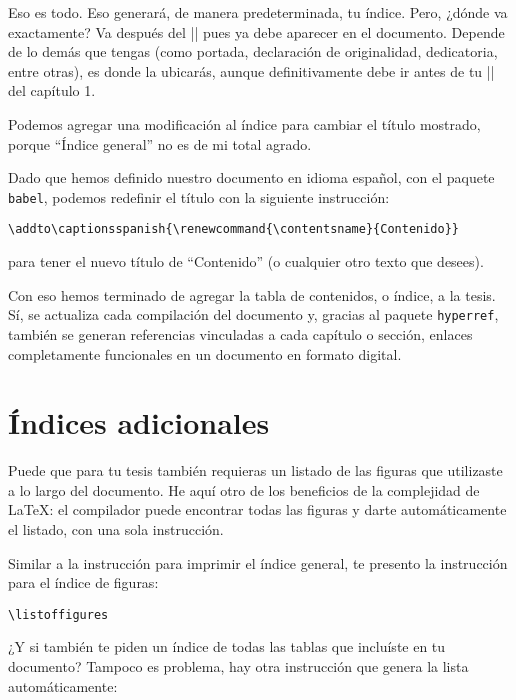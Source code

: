Eso es todo. Eso generará, de manera predeterminada, tu índice. Pero, ¿dónde va exactamente? Va después del || pues ya debe aparecer en el documento. Depende de lo demás que tengas (como portada, declaración de originalidad, dedicatoria, entre otras), es donde la ubicarás, aunque definitivamente debe ir antes de tu || del capítulo 1.

Podemos agregar una modificación al índice para cambiar el título mostrado, porque ``Índice general'' no es de mi total agrado.

Dado que hemos definido nuestro documento en idioma español, con el paquete \texttt{babel}, podemos redefinir el título con la siguiente instrucción:

\begin{lstlisting}[style=latex]
\addto\captionsspanish{\renewcommand{\contentsname}{Contenido}}
\end{lstlisting}

\noindent para tener el nuevo título de ``Contenido'' (o cualquier otro texto que desees).

Con eso hemos terminado de agregar la tabla de contenidos, o índice, a la tesis. Sí, se actualiza cada compilación del documento y, gracias al paquete \texttt{hyperref}, también se generan referencias vinculadas a cada capítulo o sección, enlaces completamente funcionales en un documento en formato digital.



\section{Índices adicionales}
\label{sec:indices_adicionales}



Puede que para tu tesis también requieras un listado de las figuras que utilizaste a lo largo del documento. He aquí otro de los beneficios de la complejidad de \LaTeX{}: el compilador puede encontrar todas las figuras y darte automáticamente el listado, con una sola instrucción.

Similar a la instrucción para imprimir el índice general, te presento la instrucción para el índice de figuras:

\begin{lstlisting}[style=latex]
\listoffigures
\end{lstlisting}

¿Y si también te piden un índice de todas las tablas que incluíste en tu documento? Tampoco es problema, hay otra instrucción que genera la lista automáticamente:

